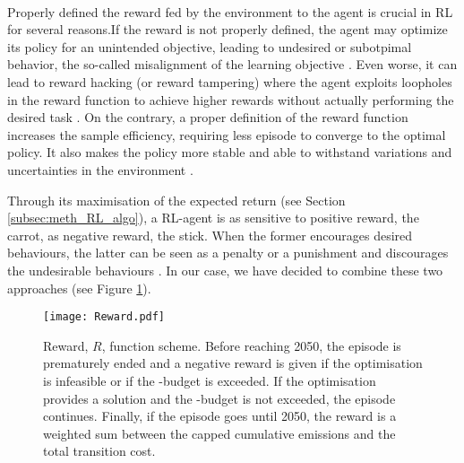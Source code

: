 \\

\noindent
Properly defined the reward fed by the environment to the agent is crucial in \gls{RL} for several reasons.If the reward is not properly defined, the agent may optimize its policy for an unintended objective, leading to undesired or subotpimal behavior, \ie the so-called misalignment of the learning objective \cite{christiano2017deep}. Even worse, it can lead to reward hacking (or reward tampering) where the agent exploits loopholes in the reward function to achieve higher rewards without actually performing the desired task \cite{amodei2016concrete}. On the contrary, a proper definition of the reward function increases the sample efficiency, \ie requiring less episode to converge to the optimal policy.  It also makes the policy more stable and able to withstand variations and uncertainties in the environment \cite{henderson2018deep}.

Through its maximisation of the expected return (see Section \ref{subsec:meth_RL_algo}), a \gls{RL}-agent is as sensitive to positive reward, \ie the carrot, as negative reward, \ie the stick.  When the former encourages desired behaviours, the latter can be seen as a penalty or a punishment and discourages the undesirable behaviours \cite{sutton2018reinforcement}. In our case, we have decided to combine these two approaches (see Figure \ref{fig:Reward}).

\begin{figure}[!htbp]
\centering
\texttt{[image: Reward.pdf]}
\caption{Reward, $R$, function scheme. Before reaching 2050, the episode is prematurely ended and a negative reward is given if the optimisation is infeasible or if the -budget is exceeded. If the optimisation provides a solution and the -budget is not exceeded, the episode continues. Finally, if the episode goes until 2050, the reward is a weighted sum between the capped cumulative emissions and the total transition cost.}
\label{fig:Reward}
\end{figure} 

